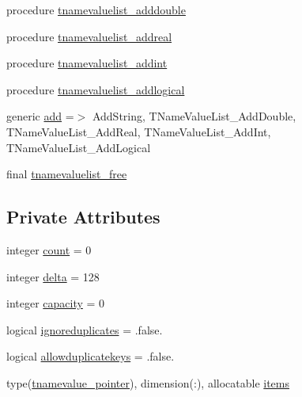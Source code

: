 \begin{DoxyCompactItemize}
\item 
procedure \mbox{\hyperlink{structiniobjects_1_1tnamevaluelist_aee119c005d684a9774a4c25c3ecf6244}{tnamevaluelist\+\_\+adddouble}}
\item 
procedure \mbox{\hyperlink{structiniobjects_1_1tnamevaluelist_a99ed2f002c2a5d22fa102babf2243042}{tnamevaluelist\+\_\+addreal}}
\item 
procedure \mbox{\hyperlink{structiniobjects_1_1tnamevaluelist_a8876bc647a4b8fa9793472eec76ceea9}{tnamevaluelist\+\_\+addint}}
\item 
procedure \mbox{\hyperlink{structiniobjects_1_1tnamevaluelist_a2e6d6ba82edafa92a819dea6339447d1}{tnamevaluelist\+\_\+addlogical}}
\item 
generic \mbox{\hyperlink{structiniobjects_1_1tnamevaluelist_a7a8cdd15c953504d85cbc9da0ec49f40}{add}} =$>$ Add\+String, T\+Name\+Value\+List\+\_\+\+Add\+Double, T\+Name\+Value\+List\+\_\+\+Add\+Real, T\+Name\+Value\+List\+\_\+\+Add\+Int, T\+Name\+Value\+List\+\_\+\+Add\+Logical
\item 
final \mbox{\hyperlink{structiniobjects_1_1tnamevaluelist_a7e700d2d9876e90a8ec4e31895d92bcd}{tnamevaluelist\+\_\+free}}
\end{DoxyCompactItemize}
\subsection*{Private Attributes}
\begin{DoxyCompactItemize}
\item 
integer \mbox{\hyperlink{structiniobjects_1_1tnamevaluelist_aefc4bbf12eb324ed3d44f5037f733b80}{count}} = 0
\item 
integer \mbox{\hyperlink{structiniobjects_1_1tnamevaluelist_ae39819575ebbe0e87dc4913779d5d8f8}{delta}} = 128
\item 
integer \mbox{\hyperlink{structiniobjects_1_1tnamevaluelist_ae03490514a2974ca543ca1d0f2bf5335}{capacity}} = 0
\item 
logical \mbox{\hyperlink{structiniobjects_1_1tnamevaluelist_a07ca6936cfeefc1da80d4ad0a2ea41eb}{ignoreduplicates}} = .false.
\item 
logical \mbox{\hyperlink{structiniobjects_1_1tnamevaluelist_a7d6a2f0bdf3ee393f5cb41e12c37e298}{allowduplicatekeys}} = .false.
\item 
type(\mbox{\hyperlink{structiniobjects_1_1tnamevalue__pointer}{tnamevalue\+\_\+pointer}}), dimension(\+:), allocatable \mbox{\hyperlink{structiniobjects_1_1tnamevaluelist_a41461487812a68a32d501efd8c5c40e7}{items}}
\end{DoxyCompactItemize}


